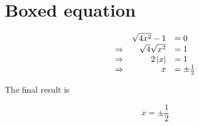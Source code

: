 \documentclass{article}
\begin{document}
\section*{Boxed equation}

\[
\begin{array}{ r r l}
		& \sqrt{4 x^2} - 1 &= 0 \\
	\Rightarrow & \sqrt{4} \sqrt{x^2} &= 1 \\
	\Rightarrow & 2 \left|x\right| &= 1 \\
	\Rightarrow & x &= \pm \frac{1}{2}
\end{array}
\]

The final result is

\begin{equation}
	\boxed{x = \pm \frac{1}{2}}
\end{equation}
\end{document}
